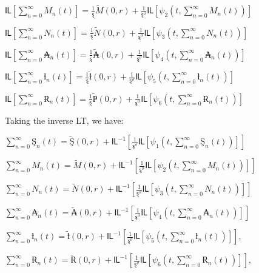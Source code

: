 \documentclass[
]{article}
\begin{document}
\(Ỻ\left\lbrack \sum_{n = 0}^{\infty}{}M_{n}(t) \right\rbrack = \frac{1}{ȿ}\widetilde{M}(0,r) + \frac{1}{ȿ^{\vartheta}}Ỻ\left\lbrack \psi_{2}\left( t,\sum_{n = 0}^{\infty}{}M_{n}(t) \right) \right\rbrack\)

\(Ỻ\left\lbrack \sum_{n = 0}^{\infty}{}N_{n}(t) \right\rbrack = \frac{1}{ȿ}\widetilde{N}(0,r) + \frac{1}{ȿ^{\vartheta}}Ỻ\left\lbrack \psi_{3}\left( t,\sum_{n = 0}^{\infty}{}N_{n}(t) \right) \right\rbrack\)

\(Ỻ\left\lbrack \sum_{n = 0}^{\infty}{}₳_{n}(t) \right\rbrack = \frac{1}{ȿ}\widetilde{₳}(0,r) + \frac{1}{ȿ^{\vartheta}}Ỻ\left\lbrack \psi_{4}\left( t,\sum_{n = 0}^{\infty}{}₳_{n}(t) \right) \right\rbrack\)

\(Ỻ\left\lbrack \sum_{n = 0}^{\infty}{}ƚ_{n}(t) \right\rbrack = \frac{1}{ȿ}\widetilde{ƚ}(0,r) + \frac{1}{ȿ^{\vartheta}}Ỻ\left\lbrack \psi_{5}\left( t,\sum_{n = 0}^{\infty}{}ƚ_{n}(t) \right) \right\rbrack\)

\(Ỻ\left\lbrack \sum_{n = 0}^{\infty}{}Ɍ_{n}(t) \right\rbrack = \frac{1}{ȿ}\widetilde{Ҏ}(0,r) + \frac{1}{ȿ^{\vartheta}}Ỻ\left\lbrack \psi_{6}\left( t,\sum_{n = 0}^{\infty}{}Ɍ_{n}(t) \right) \right\rbrack\)

Taking the inverse LT, we have:

\(\sum_{n = 0}^{\infty}{}Ş_{n}(t) = \widetilde{Ş}(0,r) + Ỻ^{- 1}\left\lbrack \frac{1}{ȿ^{\vartheta}}Ỻ\left\lbrack \psi_{1}\left( t,\sum_{n = 0}^{\infty}{}Ş_{n}(t) \right) \right\rbrack \right\rbrack\)

\(\sum_{n = 0}^{\infty}{}M_{n}(t) = \widetilde{M}(0,r) + Ỻ^{- 1}\left\lbrack \frac{1}{ȿ^{\vartheta}}Ỻ\left\lbrack \psi_{2}\left( t,\sum_{n = 0}^{\infty}{}M_{n}(t) \right) \right\rbrack \right\rbrack\)

\(\sum_{n = 0}^{\infty}{}N_{n}(t) = \widetilde{N}(0,r) + Ỻ^{- 1}\left\lbrack \frac{1}{ȿ^{\vartheta}}Ỻ\left\lbrack \psi_{3}\left( t,\sum_{n = 0}^{\infty}{}N_{n}(t) \right) \right\rbrack \right\rbrack\)

\(\sum_{n = 0}^{\infty}{}₳_{n}(t) = \widetilde{₳}(0,r) + Ỻ^{- 1}\left\lbrack \frac{1}{ȿ^{\vartheta}}Ỻ\left\lbrack \psi_{4}\left( t,\sum_{n = 0}^{\infty}{}₳_{n}(t) \right) \right\rbrack \right\rbrack\)

\(\sum_{n = 0}^{\infty}{}ƚ_{n}(t) = \widetilde{ƚ}(0,r) + Ỻ^{- 1}\left\lbrack \frac{1}{ȿ^{\vartheta}}Ỻ\left\lbrack \psi_{5}\left( t,\sum_{n = 0}^{\infty}{}ƚ_{n}(t) \right) \right\rbrack \right\rbrack,\)

\(\sum_{n = 0}^{\infty}{}Ɍ_{n}(t) = \widetilde{Ɍ}(0,r) + Ỻ^{- 1}\left\lbrack \frac{1}{ȿ^{\vartheta}}Ỻ\left\lbrack \psi_{6}\left( t,\sum_{n = 0}^{\infty}{}Ɍ_{n}(t) \right) \right\rbrack \right\rbrack,\)
\end{document}
